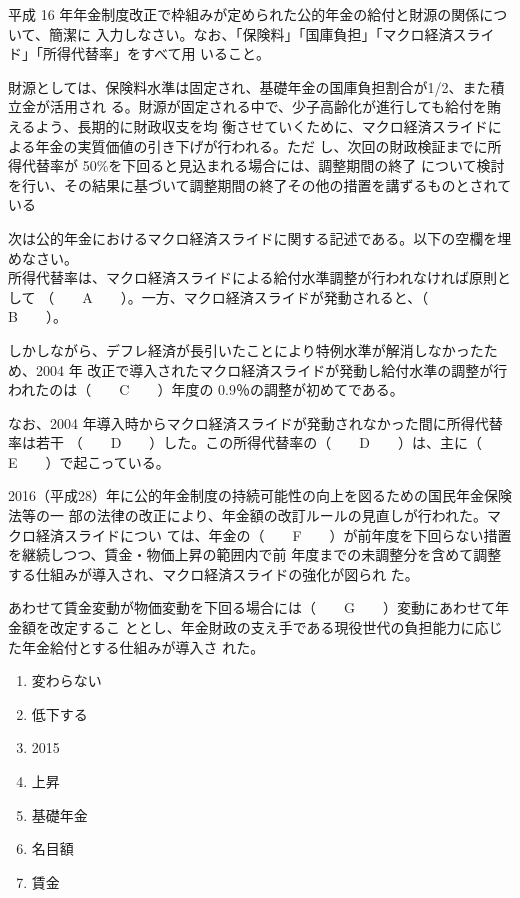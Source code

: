 \begin{shortanswer}[年金1 2024 問題2(3)ア]
  平成 16 年年金制度改正で枠組みが定められた公的年金の給付と財源の関係について、簡潔に
入力しなさい。なお、「保険料」「国庫負担」「マクロ経済スライド」「所得代替率」をすべて用
いること。
\end{shortanswer}

\begin{answerbox}
  財源としては、保険料水準は固定され、基礎年金の国庫負担割合が1/2、また積立金が活用され
る。財源が固定される中で、少子高齢化が進行しても給付を賄えるよう、長期的に財政収支を均
衡させていくために、マクロ経済スライドによる年金の実質価値の引き下げが行われる。ただ
し、次回の財政検証までに所得代替率が 50\%を下回ると見込まれる場合には、調整期間の終了
について検討を行い、その結果に基づいて調整期間の終了その他の措置を講ずるものとされて
いる
\end{answerbox}


\begin{fillblank}[年金2 2021 問題1(4)]
  次は公的年金におけるマクロ経済スライドに関する記述である。以下の空欄を埋めなさい。
\\

  所得代替率は、マクロ経済スライドによる給付水準調整が行われなければ原則として
（　　A　　）。一方、マクロ経済スライドが発動されると、（　　B　　）。

しかしながら、デフレ経済が長引いたことにより特例水準が解消しなかったため、2004 年
改正で導入されたマクロ経済スライドが発動し給付水準の調整が行われたのは（　　C　　）年度の
0.9％の調整が初めてである。

なお、2004 年導入時からマクロ経済スライドが発動されなかった間に所得代替率は若干
（　　D　　）した。この所得代替率の（　　D　　）は、主に（　　E　　）で起こっている。

2016（平成28）年に公的年金制度の持続可能性の向上を図るための国民年金保険法等の一
部の法律の改正により、年金額の改訂ルールの見直しが行われた。マクロ経済スライドについ
ては、年金の（　　F　　）が前年度を下回らない措置を継続しつつ、賃金・物価上昇の範囲内で前
年度までの未調整分を含めて調整する仕組みが導入され、マクロ経済スライドの強化が図られ
た。

あわせて賃金変動が物価変動を下回る場合には（　　G　　）変動にあわせて年金額を改定するこ
ととし、年金財政の支え手である現役世代の負担能力に応じた年金給付とする仕組みが導入さ
れた。
\end{fillblank}

\begin{answerbox}
  \begin{enumerate}[A: ]
    \item 変わらない
    \item 低下する
    \item 2015
    \item 上昇
    \item 基礎年金
    \item 名目額
    \item 賃金
  \end{enumerate}
\end{answerbox}


